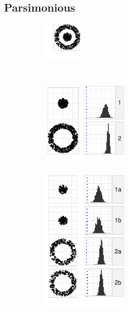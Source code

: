 \subsection{Parsimonious}
  \begin{figure}
    \centering
    \begin{minipage}[b]{1.7in}
       \begin{subfigure}[b]{\linewidth}
  	\includegraphics[width=0.75in]{images/donut1-donut2.pdf}
      \caption{}
      \label{fig:pars1}
      \end{subfigure}\\[\baselineskip]
      \begin{subfigure}[b]{\linewidth}
  	\includegraphics[width=1.65in]{images/19_5065416601259-cluster.pdf}
      \caption{}
      \label{fig:pars2}
      \end{subfigure}
      \begin{subfigure}[b]{\linewidth}
  	\includegraphics[width=1.65in]{images/9_27395081160431-cluster1.pdf}
        \caption{}
      \label{fig:pars3}        
      \end{subfigure}
    \end{minipage}
    \begin{subfigure}[b]{1.7in}

\end{subfigure}
\end{figure}
